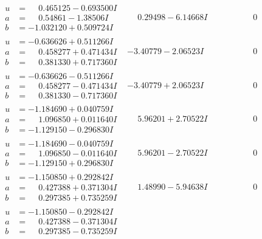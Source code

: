 \documentclass[1p]{elsarticle_modified}
\theoremstyle{definition}
\begin{document}
$$\begin{array}{c|c|c}
\begin{aligned}
u &= \phantom{-}0.465125 - 0.693500 I \\
a &= \phantom{-}0.54861 - 1.38506 I \\
b &= -1.032120 + 0.509724 I\end{aligned}
 & \phantom{-}0.29498 - 6.14668 I & \phantom{-0.000000 } 0 \\ \hline\begin{aligned}
u &= -0.636626 + 0.511266 I \\
a &= \phantom{-}0.458277 + 0.471434 I \\
b &= \phantom{-}0.381330 + 0.717360 I\end{aligned}
 & -3.40779 - 2.06523 I & \phantom{-0.000000 } 0 \\ \hline\begin{aligned}
u &= -0.636626 - 0.511266 I \\
a &= \phantom{-}0.458277 - 0.471434 I \\
b &= \phantom{-}0.381330 - 0.717360 I\end{aligned}
 & -3.40779 + 2.06523 I & \phantom{-0.000000 } 0 \\ \hline\begin{aligned}
u &= -1.184690 + 0.040759 I \\
a &= \phantom{-}1.096850 + 0.011640 I \\
b &= -1.129150 - 0.296830 I\end{aligned}
 & \phantom{-}5.96201 + 2.70522 I & \phantom{-0.000000 } 0 \\ \hline\begin{aligned}
u &= -1.184690 - 0.040759 I \\
a &= \phantom{-}1.096850 - 0.011640 I \\
b &= -1.129150 + 0.296830 I\end{aligned}
 & \phantom{-}5.96201 - 2.70522 I & \phantom{-0.000000 } 0 \\ \hline\begin{aligned}
u &= -1.150850 + 0.292842 I \\
a &= \phantom{-}0.427388 + 0.371304 I \\
b &= \phantom{-}0.297385 + 0.735259 I\end{aligned}
 & \phantom{-}1.48990 - 5.94638 I & \phantom{-0.000000 } 0 \\ \hline\begin{aligned}
u &= -1.150850 - 0.292842 I \\
a &= \phantom{-}0.427388 - 0.371304 I \\
b &= \phantom{-}0.297385 - 0.735259 I\end{aligned}

\end{array}$$
\end{document}
